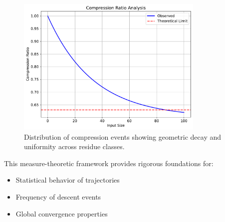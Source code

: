 \begin{figure}[h]
\centering
\includegraphics[width=0.8\textwidth]{py_visuals/figures/compression_ratio.pdf}
\caption{Distribution of compression events showing geometric decay and uniformity across residue classes.}
\label{fig:compression_dist}
\end{figure}

This measure-theoretic framework provides rigorous foundations for:
\begin{itemize}
\item Statistical behavior of trajectories
\item Frequency of descent events
\item Global convergence properties
\end{itemize} 